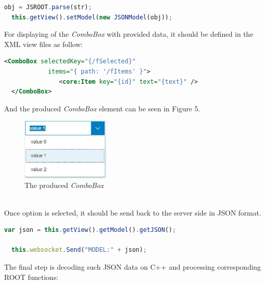 \documentclass[a4paper]{jpconf}
\begin{document}
\begin{lstlisting}[language=JavaScript]
  obj = JSROOT.parse(str);
  this.getView().setModel(new JSONModel(obj));
\end{lstlisting}
\noindent
For displaying of the \textit{ComboBox} with provided data, it should be defined in the XML view files as follow:

\begin{lstlisting}[language=XML]
  <ComboBox selectedKey="{/fSelected}"
            items="{ path: '/fItems' }">
               <core:Item key="{id}" text="{text}" />
  </ComboBox>
\end{lstlisting}

\noindent
And the produced \textit{ComboBox} element can be seen in Figure 5.
\begin{figure}[h]
  \begin{center}
    \includegraphics[width=10pc]{testCombo.eps}\hspace{2pc}%
  \end{center}
  \centering
\begin{minipage}[b]{20pc}\caption{\label{label}The produced \textit{ComboBox}}
\end{minipage}
\end{figure}
\\
\noindent
Once option is selected, it should be send back to the server side in JSON format.
\begin{lstlisting}[language=JavaScript]
  var json = this.getView().getModel().getJSON();

  this.websocket.Send("MODEL:" + json);
\end{lstlisting}
\noindent
The final step is decoding such JSON data on C++ and processing corresponding ROOT functions:
\end{document}
